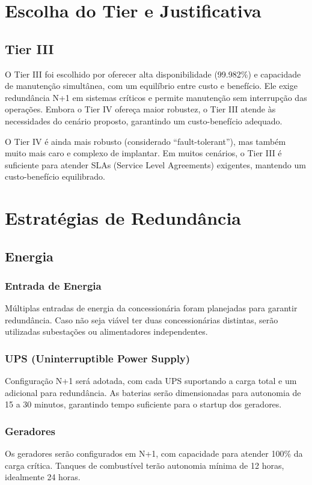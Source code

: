 \documentclass[
	12pt,				%
	oneside,			%
	a4paper,			%
	english,			%
	brazil				%
	]{abntex2unama}
\begin{document}
\chapter{Escolha do Tier e Justificativa}
\section{Tier III}
O Tier III foi escolhido por oferecer alta disponibilidade (99.982\%) e capacidade de manutenção simultânea, com um equilíbrio entre custo e benefício. Ele exige redundância N+1 em sistemas críticos e permite manutenção sem interrupção das operações. Embora o Tier IV ofereça maior robustez, o Tier III atende às necessidades do cenário proposto, garantindo um custo-benefício adequado.

O Tier IV é ainda mais robusto (considerado “fault-tolerant”), mas também muito mais caro e complexo de implantar. Em muitos cenários, o Tier III é suficiente para atender SLAs (Service Level Agreements) exigentes, mantendo um custo-benefício equilibrado.

\chapter{Estratégias de Redundância}
\section{Energia}
\subsection{Entrada de Energia}
Múltiplas entradas de energia da concessionária foram planejadas para garantir redundância. Caso não seja viável ter duas concessionárias distintas, serão utilizadas subestações ou alimentadores independentes.

\subsection{UPS (Uninterruptible Power Supply)}
Configuração N+1 será adotada, com cada UPS suportando a carga total e um adicional para redundância. As baterias serão dimensionadas para autonomia de 15 a 30 minutos, garantindo tempo suficiente para o startup dos geradores.

\subsection{Geradores}
Os geradores serão configurados em N+1, com capacidade para atender 100\% da carga crítica. Tanques de combustível terão autonomia mínima de 12 horas, idealmente 24 horas.
\end{document}
